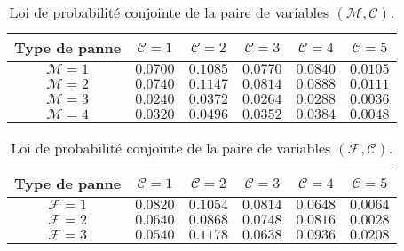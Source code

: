 \documentclass[a4paper, 12pt]{article}
\newcommand{\M}{\mathcal{M}}
\newcommand{\F}{\mathcal{F}}
\newcommand{\C}{\mathcal{C}}
\begin{document}
    \begin{table}[!ht]
	    \centering
	    \begin{tabular}{|c|c|c|c|c|c|}
            \hline
            \textbf{Type de panne} & \textbf{$\C=1$} & \textbf{$\C=2$} & \textbf{$\C=3$} & \textbf{$\C=4$} & \textbf{$\C=5$}\\
            \hline
            \hline
            \(\textbf{$\M=1$}\) & \(\num{0,0700}\) & \(\num{0,1085}\) & \(\num{0,0770}\) & \(\num{0,0840}\) & \(\num{0,0105}\)\\
            \hline
            \(\textbf{$\M=2$}\) & \(\num{0,0740}\) & \(\num{0,1147}\) & \(\num{0,0814}\) & \(\num{0,0888}\) & \(\num{0,0111}\)\\
            \hline
            \(\textbf{$\M=3$}\) & \(\num{0,0240}\) & \(\num{0,0372}\) & \(\num{0,0264}\) & \(\num{0,0288}\) & \(\num{0,0036}\)\\
            \hline
            \(\textbf{$\M=4$}\) & \(\num{0,0320}\) & \(\num{0,0496}\) & \(\num{0,0352}\) & \(\num{0,0384}\) & \(\num{0,0048}\)\\
            \hline
        \end{tabular}
        \caption{Loi de probabilité conjointe de la paire de variables \(\left(\M,\C\right)\).}
        \label{tab:tab_Q1b_ii}
    \end{table}
    \begin{table}[!ht]
	    \centering
	    \begin{tabular}{|c|c|c|c|c|c|}
            \hline
            \textbf{Type de panne} & \textbf{$\C=1$} & \textbf{$\C=2$} & \textbf{$\C=3$} & \textbf{$\C=4$} & \textbf{$\C=5$}\\
            \hline
            \hline
            \(\textbf{$\F=1$}\) & \(\num{0,0820}\) & \(\num{0,1054}\) & \(\num{0,0814}\) & \(\num{0,0648}\) & \(\num{0,0064}\)\\
            \hline
            \(\textbf{$\F=2$}\) & \(\num{0,0640}\) & \(\num{0,0868}\) & \(\num{0,0748}\) & \(\num{0,0816}\) & \(\num{0,0028}\)\\
            \hline
            \(\textbf{$\F=3$}\) & \(\num{0,0540}\) & \(\num{0,1178}\) & \(\num{0,0638}\) & \(\num{0,0936}\) & \(\num{0,0208}\)\\
            \hline
            \end{tabular}
        \caption{Loi de probabilité conjointe de la paire de variables \(\left(\F,\C\right)\).}
        \label{tab:tab_Q1b_iii}
    \end{table}
\end{document}
